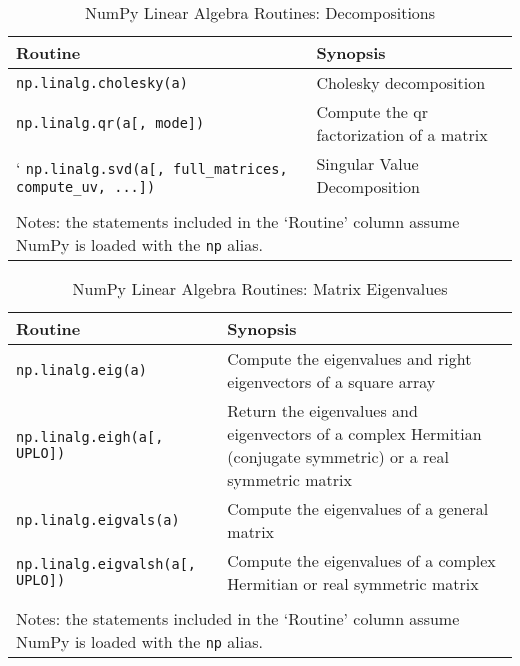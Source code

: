 \documentclass[a4paper,11pt]{book}
\numberwithin{figure}{chapter}
\numberwithin{table}{chapter}
\begin{document}
\begin{sidewaystable}[!htbp]
	\centering
	\caption{NumPy Linear Algebra Routines: Decompositions}
	\label{tab:decompositions}
	\begin{tabular}{ll}
		\toprule \toprule
			Routine & Synopsis \\
			\midrule
                        \texttt{np.linalg.cholesky(a)} &
                        Cholesky decomposition\\
                        \texttt{np.linalg.qr(a[, mode])} & 
                        Compute the qr factorization of a matrix\\`
                        \texttt{np.linalg.svd(a[, full\_matrices, compute\_uv, ...])} & 
                        Singular Value Decomposition\\
	     	\bottomrule \\[-1.8ex]
	        \multicolumn{2}{l}{Notes: the statements included in the `Routine' column assume NumPy is loaded with the \texttt{np} alias.} \\
	\end{tabular}
\end{sidewaystable}

\begin{sidewaystable}[!htbp]
	\centering
	\caption{NumPy Linear Algebra Routines: Matrix Eigenvalues}
	\label{tab:eigenvalues}
	\begin{tabular}{lp{12cm}}
		\toprule \toprule
			Routine & Synopsis \\
			\midrule
                        \texttt{np.linalg.eig(a)} &
                        Compute the eigenvalues and right eigenvectors of a square array\\
                        \texttt{np.linalg.eigh(a[, UPLO])} & 
                        Return the eigenvalues and eigenvectors of a complex Hermitian (conjugate symmetric) or a real symmetric matrix\\
                        \texttt{np.linalg.eigvals(a)} & 
                        Compute the eigenvalues of a general matrix\\
                        \texttt{np.linalg.eigvalsh(a[, UPLO])} &
                        Compute the eigenvalues of a complex Hermitian or real symmetric matrix\\
	     	\bottomrule \\[-1.8ex]
	        \multicolumn{2}{l}{Notes: the statements included in the `Routine' column assume NumPy is loaded with the \texttt{np} alias.} \\
	\end{tabular}
\end{sidewaystable}
\end{document}
